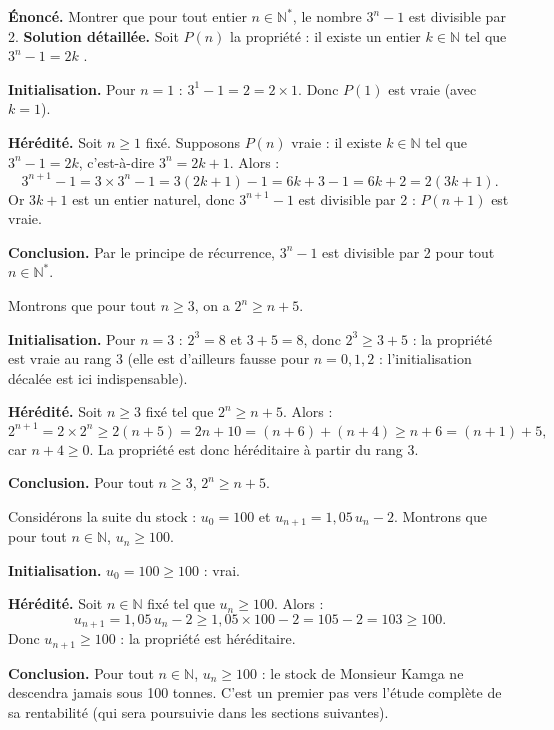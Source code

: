 \documentclass[11pt]{article}
\begin{document}
\begin{exoresolu}
\textbf{Énoncé.} Montrer que pour tout entier $n \in \mathbb{N}^*$, le nombre $3^n - 1$ est divisible par 2.
\tcblower
\textbf{Solution détaillée.} Soit $P(n)$ la propriété : \og il existe un entier $k \in \mathbb{N}$ tel que $3^n - 1 = 2k$ \fg.

\textbf{Initialisation.} Pour $n = 1$ : $3^1 - 1 = 2 = 2 \times 1$. Donc $P(1)$ est vraie (avec $k = 1$).

\textbf{Hérédité.} Soit $n \geq 1$ fixé. Supposons $P(n)$ vraie : il existe $k \in \mathbb{N}$ tel que $3^n - 1 = 2k$, c'est-à-dire $3^n = 2k + 1$. Alors :
\[ 3^{n+1} - 1 = 3 \times 3^n - 1 = 3(2k+1) - 1 = 6k + 3 - 1 = 6k + 2 = 2(3k+1). \]
Or $3k + 1$ est un entier naturel, donc $3^{n+1} - 1$ est divisible par 2 : $P(n+1)$ est vraie.

\textbf{Conclusion.} Par le principe de récurrence, $3^n - 1$ est divisible par 2 pour tout $n \in \mathbb{N}^*$.
\end{exoresolu}

\begin{exemplebox}
Montrons que pour tout $n \geq 3$, on a $2^n \geq n + 5$.

\textbf{Initialisation.} Pour $n = 3$ : $2^3 = 8$ et $3 + 5 = 8$, donc $2^3 \geq 3 + 5$ : la propriété est vraie au rang $3$ (elle est d'ailleurs fausse pour $n = 0, 1, 2$ : l'initialisation décalée est ici indispensable).

\textbf{Hérédité.} Soit $n \geq 3$ fixé tel que $2^n \geq n + 5$. Alors :
\[ 2^{n+1} = 2 \times 2^n \geq 2(n+5) = 2n + 10 = (n + 6) + (n + 4) \geq n + 6 = (n+1) + 5, \]
car $n + 4 \geq 0$. La propriété est donc héréditaire à partir du rang 3.

\textbf{Conclusion.} Pour tout $n \geq 3$, $2^n \geq n + 5$.
\end{exemplebox}

\begin{exemplebox}
Considérons la suite du stock : $u_0 = 100$ et $u_{n+1} = 1{,}05\,u_n - 2$. Montrons que pour tout $n \in \mathbb{N}$, $u_n \geq 100$.

\textbf{Initialisation.} $u_0 = 100 \geq 100$ : vrai.

\textbf{Hérédité.} Soit $n \in \mathbb{N}$ fixé tel que $u_n \geq 100$. Alors :
\[ u_{n+1} = 1{,}05\,u_n - 2 \geq 1{,}05 \times 100 - 2 = 105 - 2 = 103 \geq 100. \]
Donc $u_{n+1} \geq 100$ : la propriété est héréditaire.

\textbf{Conclusion.} Pour tout $n \in \mathbb{N}$, $u_n \geq 100$ : le stock de Monsieur Kamga ne descendra jamais sous 100 tonnes. C'est un premier pas vers l'étude complète de sa rentabilité (qui sera poursuivie dans les sections suivantes).
\end{exemplebox}
\end{document}
